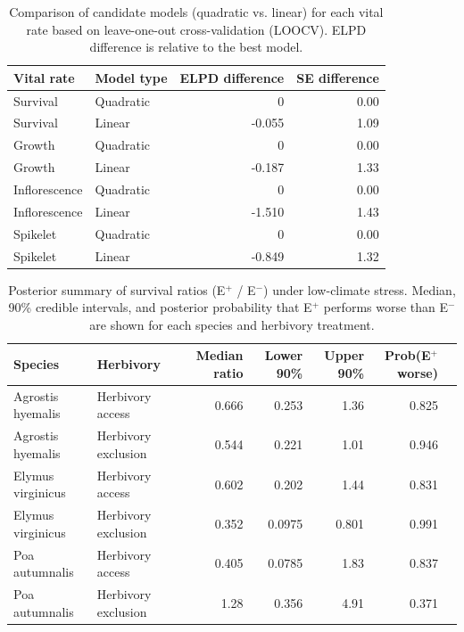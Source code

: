 \documentclass[12pt]{article}\usepackage[]{graphicx}\usepackage[dvipsnames]{xcolor}
\begin{document}
{\begin{table}[ht]
\centering
\caption[Model comparison for vital rates (quadratic vs. linear models)]{Comparison of candidate models (quadratic vs. linear) for each vital rate based on leave-one-out cross-validation (LOOCV). 
ELPD difference is relative to the best model.}
\label{tab:model_comparison}
\begin{tabular}{l l r r}
\hline
\textbf{Vital rate} & \textbf{Model type} & \textbf{ELPD difference} & \textbf{SE difference} \\
\hline
Survival        & Quadratic & 0       & 0.00 \\
Survival        & Linear    & -0.055  & 1.09 \\
Growth          & Quadratic & 0       & 0.00 \\
Growth          & Linear    & -0.187  & 1.33 \\
Inflorescence   & Quadratic & 0       & 0.00 \\
Inflorescence   & Linear    & -1.510  & 1.43 \\
Spikelet        & Quadratic & 0       & 0.00 \\
Spikelet        & Linear    & -0.849  & 1.32 \\
\hline
\end{tabular}
\end{table}
\clearpage
 
 \begin{landscape}
\begin{table}[ht]
\centering
\caption{Posterior summary of survival ratios (E$^+$ / E$^-$) under low-climate stress. Median, 90\% credible intervals, and posterior probability that E$^+$ performs worse than E$^-$ are shown for each species and herbivory treatment.}
\label{tab:ratio_surv_summary}
\begin{tabular}{llrrrrr}
\hline
Species & Herbivory & Median ratio & Lower 90\% & Upper 90\% & Prob(E$^+$ worse) \\
\hline
Agrostis hyemalis & Herbivory access & 0.666 & 0.253 & 1.36 & 0.825 \\
Agrostis hyemalis & Herbivory exclusion & 0.544 & 0.221 & 1.01 & 0.946 \\
Elymus virginicus & Herbivory access & 0.602 & 0.202 & 1.44 & 0.831 \\
Elymus virginicus & Herbivory exclusion & 0.352 & 0.0975 & 0.801 & 0.991 \\
Poa autumnalis & Herbivory access & 0.405 & 0.0785 & 1.83 & 0.837 \\
Poa autumnalis & Herbivory exclusion & 1.28 & 0.356 & 4.91 & 0.371 \\
\hline
\end{tabular}
\end{table}
\end{landscape}
\clearpage  %


}
\end{document}
